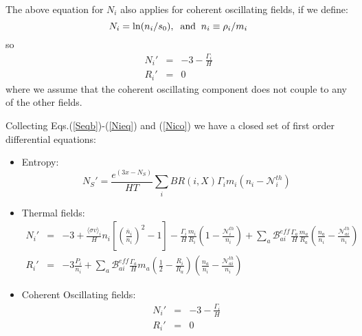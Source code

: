 \documentclass[preprint,notoc]{JHEP3}
\def\sigv{\langle \sigma v \rangle}
\begin{document}
The above equation for $N_i$ also applies for coherent oscillating fields, if we define:
\begin{equation}
N_i = \ln(n_i/s_0),\;\; {\rm and}\;\; n_i \equiv \rho_i/m_i
\end{equation}
so
\begin{eqnarray}
N_i' & = & -3 - \frac{\Gamma_i}{H}  \nonumber \\
R_i'& = & 0 \label{Nico}
\end{eqnarray}
where we assume that the coherent oscillating component does not couple to any of the other fields.

Collecting Eqs.(\ref{Seqb})-(\ref{Nieq}) and (\ref{Nico}) we have a closed set of first order differential equations:
\begin{itemize}
\item Entropy:
\begin{equation}
N_S' = \frac{e^{(3 x - N_S)}}{HT} \sum_{i} BR(i,X) \Gamma_i m_i \left(n_i -
\mathcal{N}_{i}^{th} \right) \label{eq:Sfin}
\end{equation}
\item Thermal fields:
\begin{eqnarray}
N_i'& = & -3 + \frac{\sigv_i}{H} n_i [\left(\frac{\bar{n}_i}{n_i}\right)^2
-1] -  \frac{\Gamma_i}{H} \frac{m_i}{R_i}\left(1 - \frac{\mathcal{N}_{i}^{th}}{n_i}
 \right)
  +  \sum_{a} \mathcal{B}_{ai}^{eff} \frac{\Gamma_a}{H}
 \frac{m_a}{R_a}\left(\frac{n_a}{n_i} - \frac{\mathcal{N}_{ai}^{th}}{n_i}
  \right) \nonumber
 \\
R_i' & = &  -3 \frac{P_i}{n_i} + \sum_{a} \mathcal{B}_{ai}^{eff}
\frac{\Gamma_a}{H} m_a \left( \frac{1}{2} - \frac{R_i}{R_a} \right) \left(\frac{n_a}{n_i} -
\frac{\mathcal{N}_{ai}^{th}}{n_i} \right)
\end{eqnarray}
\item Coherent Oscillating fields:
\begin{eqnarray}
N_i' & = & -3 - \frac{\Gamma_i}{H} \nonumber \\
R_i' & = & 0 \label{eq:COeq}
\end{eqnarray}
\end{itemize}
\end{document}
